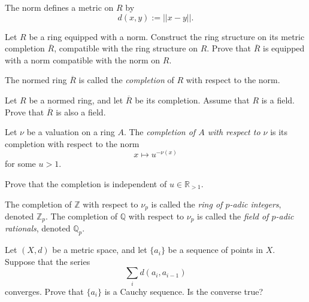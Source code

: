 \begin{remark}
\label{remark-norm-defines-metric}
The norm defines a metric on $R$ by
$$
d(x,y):=||x-y||.
$$
\end{remark}

\begin{exercise}
\label{exercise-ring-structure-completion}
Let $R$ be a ring equipped with a norm.
Construct the ring structure on its
metric completion $\overline R$,
compatible with the ring structure on
$R$. Prove that $\overline R$ is
equipped with a norm compatible with
the norm on $R$.
\end{exercise}

\begin{definition}
\label{definition-completion-normed-ring}
The normed ring $\overline R$ is called
the {\it completion} of $R$ with
respect to the norm.
\end{definition}

\begin{exercise}
\label{exercise-completion-of-field}
Let $R$ be a normed ring, and let
$\overline R$ be its completion.
Assume that $R$ is a field. Prove that
$\overline R$ is also a field.
\end{exercise}

\begin{definition}
\label{definition-completion-valuation}
Let $\nu$ be a valuation on a ring
$A$. The {\it completion of $A$ with
respect to $\nu$} is its completion
with respect to the norm
$$
x \mapsto u^{-\nu(x)}
$$
for some $u>1$.
\end{definition}

\begin{exercise}
\label{exercise-completion-independent-u}
Prove that the completion is
independent of
$u \in \mathbb R_{>1}$.
\end{exercise}

\begin{definition}
\label{definition-p-adic-integers-rationals}
The completion of $\mathbb Z$ with
respect to $\nu_p$ is called the
{\it ring of $p$-adic integers},
denoted $\mathbb Z_p$. The completion
of $\mathbb Q$ with respect to $\nu_p$
is called the {\it field of $p$-adic
rationals}, denoted $\mathbb Q_p$.
\end{definition}

\begin{exercise}
\label{exercise-summable-distances-cauchy}
Let $(X,d)$ be a metric space, and let
$\{a_i\}$ be a sequence of points in
$X$. Suppose that the series
$$
\sum_i d(a_i,a_{i-1})
$$
converges. Prove that $\{a_i\}$ is a
Cauchy sequence. Is the converse true?
\end{exercise}

